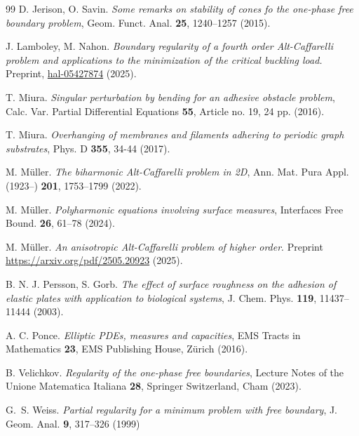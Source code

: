 \documentclass[twoside,11pt]{article}
\theoremstyle{definition}
\begin{document}
\begin{thebibliography}{99}
  D. Jerison, O. Savin. \emph{Some remarks on stability of cones fo the one-phase free boundary problem}, Geom. Funct. Anal.  {\bfseries 25}, 1240--1257 (2015).

  J. Lamboley, M. Nahon. \emph{Boundary regularity of a fourth order Alt-Caffarelli problem and
	applications to the minimization of the critical buckling load.} Preprint, \href{https://hal.science/hal-05427874v1/document}{hal-05427874} (2025).




 T. Miura. \emph{Singular perturbation by bending for an adhesive obstacle problem}, Calc. Var. Partial Differential Equations {\bfseries 55}, Article no. 19, 24 pp. (2016).

 T. Miura. \emph{Overhanging of membranes and filaments adhering to periodic graph
	substrates}, Phys. D {\bfseries 355}, 34-44 (2017).

 M. Müller. \emph{The biharmonic Alt-Caffarelli problem in 2D}, Ann. Mat. Pura Appl. (1923--) {\bfseries 201}, 1753--1799 (2022). 

 M. Müller. \emph{Polyharmonic equations involving surface measures}, Interfaces Free Bound. {\bfseries 26}, 61--78 (2024).

 M. Müller. \emph{An anisotropic Alt-Caffarelli problem of higher order}. Preprint \href{https://arxiv.org/pdf/2505.20923}{https://arxiv.org/pdf/2505.20923} (2025).




 B. N. J. Persson, S. Gorb. \emph{The effect of surface roughness on the adhesion of elastic plates with application to biological systems}, J. Chem. Phys. {\bfseries 119}, 11437--11444 (2003).



 A. C. Ponce.
\emph{Elliptic PDEs, measures and capacities},
EMS Tracts in Mathematics
{\bfseries 23}, EMS Publishing House, Z\"urich (2016).



 B. Velichkov. \emph{Regularity of the one-phase free boundaries}, Lecture Notes of the Unione Matematica Italiana {\bfseries 28}, Springer Switzerland, Cham (2023).

 G.~S. Weiss. \emph{Partial regularity for a minimum problem with free boundary}, J. Geom. Anal. {\bf 9},  317--326 (1999)

\end{thebibliography}
\end{document}
